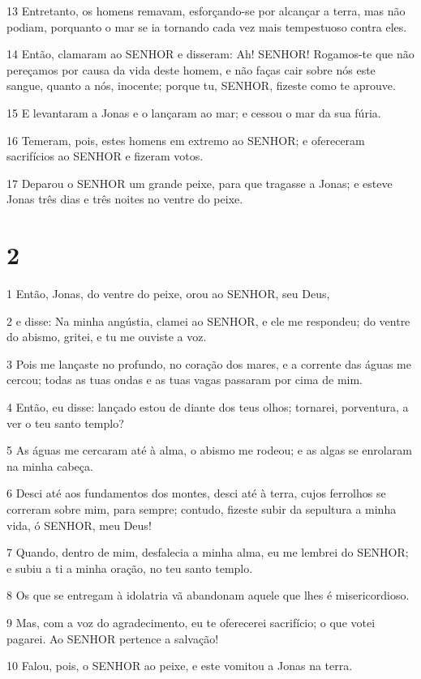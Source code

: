 \par 13 Entretanto, os homens remavam, esforçando-se por alcançar a terra, mas não podiam, porquanto o mar se ia tornando cada vez mais tempestuoso contra eles.
\par 14 Então, clamaram ao SENHOR e disseram: Ah! SENHOR! Rogamos-te que não pereçamos por causa da vida deste homem, e não faças cair sobre nós este sangue, quanto a nós, inocente; porque tu, SENHOR, fizeste como te aprouve.
\par 15 E levantaram a Jonas e o lançaram ao mar; e cessou o mar da sua fúria.
\par 16 Temeram, pois, estes homens em extremo ao SENHOR; e ofereceram sacrifícios ao SENHOR e fizeram votos.
\par 17 Deparou o SENHOR um grande peixe, para que tragasse a Jonas; e esteve Jonas três dias e três noites no ventre do peixe.

\chapter{2}

\par 1 Então, Jonas, do ventre do peixe, orou ao SENHOR, seu Deus,
\par 2 e disse: Na minha angústia, clamei ao SENHOR, e ele me respondeu; do ventre do abismo, gritei, e tu me ouviste a voz.
\par 3 Pois me lançaste no profundo, no coração dos mares, e a corrente das águas me cercou; todas as tuas ondas e as tuas vagas passaram por cima de mim.
\par 4 Então, eu disse: lançado estou de diante dos teus olhos; tornarei, porventura, a ver o teu santo templo?
\par 5 As águas me cercaram até à alma, o abismo me rodeou; e as algas se enrolaram na minha cabeça.
\par 6 Desci até aos fundamentos dos montes, desci até à terra, cujos ferrolhos se correram sobre mim, para sempre; contudo, fizeste subir da sepultura a minha vida, ó SENHOR, meu Deus!
\par 7 Quando, dentro de mim, desfalecia a minha alma, eu me lembrei do SENHOR; e subiu a ti a minha oração, no teu santo templo.
\par 8 Os que se entregam à idolatria vã abandonam aquele que lhes é misericordioso.
\par 9 Mas, com a voz do agradecimento, eu te oferecerei sacrifício; o que votei pagarei. Ao SENHOR pertence a salvação!
\par 10 Falou, pois, o SENHOR ao peixe, e este vomitou a Jonas na terra.

